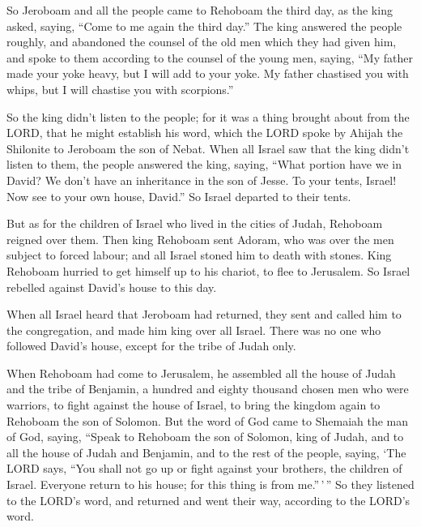  So Jeroboam and all the people came to Rehoboam the
third day, as the king asked, saying, ``Come to me again the third
day.''  The king answered the people roughly, and
abandoned the counsel of the old men which they had given him,
 and spoke to them according to the counsel of the young
men, saying, ``My father made your yoke heavy, but I will add to your
yoke. My father chastised you with whips, but I will chastise you with
scorpions.''

 So the king didn't listen to the people; for it was a
thing brought about from the LORD, that he might establish his word,
which the LORD spoke by Ahijah the Shilonite to Jeroboam the son of
Nebat.  When all Israel saw that the king didn't listen
to them, the people answered the king, saying, ``What portion have we in
David? We don't have an inheritance in the son of Jesse. To your tents,
Israel! Now see to your own house, David.'' So Israel departed to their
tents.

 But as for the children of Israel who lived in the
cities of Judah, Rehoboam reigned over them.  Then king
Rehoboam sent Adoram, who was over the men subject to forced labour; and
all Israel stoned him to death with stones. King Rehoboam hurried to get
himself up to his chariot, to flee to Jerusalem.  So
Israel rebelled against David's house to this day.

 When all Israel heard that Jeroboam had returned, they
sent and called him to the congregation, and made him king over all
Israel. There was no one who followed David's house, except for the
tribe of Judah only.

 When Rehoboam had come to Jerusalem, he assembled all
the house of Judah and the tribe of Benjamin, a hundred and eighty
thousand chosen men who were warriors, to fight against the house of
Israel, to bring the kingdom again to Rehoboam the son of Solomon.
 But the word of God came to Shemaiah the man of God,
saying,  ``Speak to Rehoboam the son of Solomon, king of
Judah, and to all the house of Judah and Benjamin, and to the rest of
the people, saying,  `The LORD says, ``You shall not go
up or fight against your brothers, the children of Israel. Everyone
return to his house; for this thing is from me.''\,'\,'' So they
listened to the LORD's word, and returned and went their way, according
to the LORD's word.


